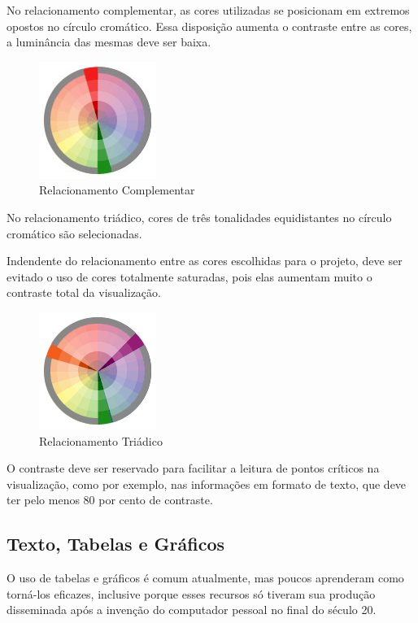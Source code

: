 \documentclass[]{article}
\begin{document}
No relacionamento complementar, as cores utilizadas se posicionam em extremos opostos no círculo cromático. Essa disposição aumenta o contraste entre as cores, a luminância das mesmas deve ser baixa.

\begin{figure}[!ht]
\centering
\includegraphics[scale=.7]{./complementary_template}
\caption[]{Relacionamento Complementar}
\label{fig:complementary_template}
\end{figure}

No relacionamento triádico, cores de três tonalidades equidistantes no círculo cromático são selecionadas.
 
Indendente do relacionamento entre as cores escolhidas para o projeto, deve ser evitado o uso de cores totalmente saturadas, pois elas aumentam muito o contraste total da visualização. 

\begin{figure}[!ht]
\centering
\includegraphics[scale=.7]{./triad_template}
\caption[]{Relacionamento Triádico}
\label{fig:triad_template}
\end{figure}

O contraste deve ser reservado para facilitar a leitura de pontos críticos na visualização, como por exemplo, nas informações em formato de texto, que deve ter pelo menos 80 por cento de contraste.

\subsection{Texto, Tabelas e Gráficos}

O uso de tabelas e gráficos é comum atualmente, mas poucos aprenderam como torná-los eficazes, inclusive porque esses recursos só tiveram sua produção disseminada após a invenção do computador pessoal no final do século 20.
\end{document}
